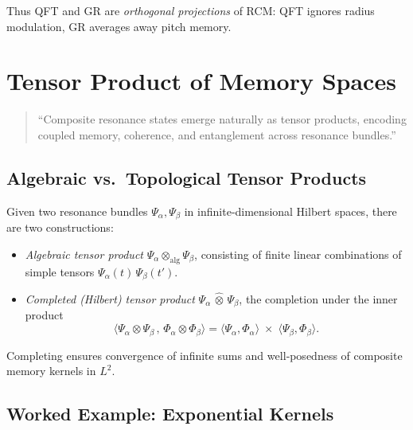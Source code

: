 \begin{concept}
Thus QFT and GR are \emph{orthogonal projections} of RCM:  
QFT ignores radius modulation, GR averages away pitch memory.
\end{concept}

\section{Tensor Product of Memory Spaces}

\begin{quote}
“Composite resonance states emerge naturally as tensor products, encoding coupled memory, coherence, and entanglement across resonance bundles.”
\end{quote}

\subsection{Algebraic vs.\ Topological Tensor Products}

Given two resonance bundles \(\Psi_{\alpha},\Psi_{\beta}\) in infinite‐dimensional Hilbert spaces, there are two constructions:

\begin{itemize}
  \item \emph{Algebraic tensor product} \(\Psi_{\alpha}\otimes_{\mathrm{alg}}\Psi_{\beta}\), consisting of finite linear combinations of simple tensors \(\Psi_{\alpha}(t)\,\Psi_{\beta}(t')\).
  \item \emph{Completed (Hilbert) tensor product} \(\Psi_{\alpha}\,\widehat\otimes\,\Psi_{\beta}\), the completion under the inner product
    \[
      \bigl\langle \Psi_{\alpha}\otimes\Psi_{\beta}\,,\,\Phi_{\alpha}\otimes\Phi_{\beta}\bigr\rangle
      = \langle\Psi_{\alpha},\Phi_{\alpha}\rangle
        \;\times\;\langle\Psi_{\beta},\Phi_{\beta}\rangle.
    \]
\end{itemize}

Completing ensures convergence of infinite sums and well‐posedness of composite memory kernels in \(L^2\).

\subsection{Worked Example: Exponential Kernels}

